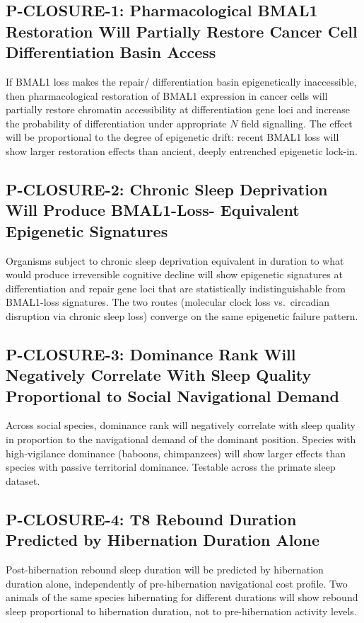 \documentclass[10pt, a4paper]{article}
\begin{document}
\subsection{P-CLOSURE-1: Pharmacological
BMAL1 Restoration Will Partially Restore
Cancer Cell Differentiation Basin Access}

If BMAL1 loss makes the repair/
differentiation basin epigenetically
inaccessible, then pharmacological
restoration of BMAL1 expression in
cancer cells will partially restore
chromatin accessibility at
differentiation gene loci and increase
the probability of differentiation
under appropriate $N$ field signalling.
The effect will be proportional to
the degree of epigenetic drift: recent
BMAL1 loss will show larger restoration
effects than ancient, deeply entrenched
epigenetic lock-in.

\subsection{P-CLOSURE-2: Chronic Sleep
Deprivation Will Produce BMAL1-Loss-
Equivalent Epigenetic Signatures}

Organisms subject to chronic sleep
deprivation equivalent in duration to
what would produce irreversible
cognitive decline will show epigenetic
signatures at differentiation and repair
gene loci that are statistically
indistinguishable from BMAL1-loss
signatures. The two routes (molecular
clock loss vs.\ circadian disruption
via chronic sleep loss) converge on
the same epigenetic failure pattern.

\subsection{P-CLOSURE-3: Dominance Rank
Will Negatively Correlate With Sleep
Quality Proportional to Social
Navigational Demand}

Across social species, dominance rank
will negatively correlate with sleep
quality in proportion to the navigational
demand of the dominant position.
Species with high-vigilance dominance
(baboons, chimpanzees) will show larger
effects than species with passive
territorial dominance. Testable across
the primate sleep dataset.

\subsection{P-CLOSURE-4: T8 Rebound
Duration Predicted by Hibernation
Duration Alone}

Post-hibernation rebound sleep duration
will be predicted by hibernation duration
alone, independently of pre-hibernation
navigational cost profile. Two animals
of the same species hibernating for
different durations will show rebound
sleep proportional to hibernation
duration, not to pre-hibernation
activity levels.
\end{document}
